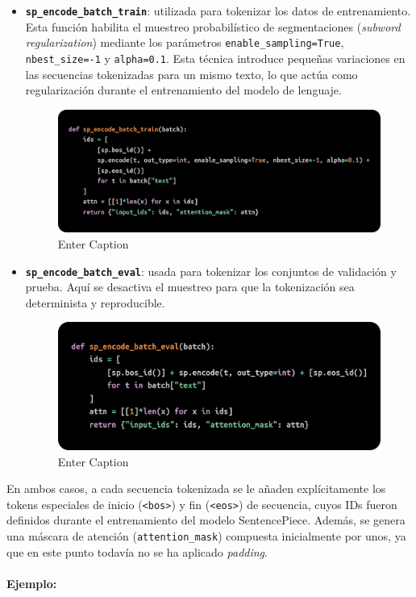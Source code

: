 \documentclass[11pt]{book}
\begin{document}
\begin{itemize}
    \item \textbf{\texttt{sp\_encode\_batch\_train}}: utilizada para tokenizar los datos de entrenamiento. Esta función habilita el muestreo probabilístico de segmentaciones (\textit{subword regularization}) mediante los parámetros \texttt{enable\_sampling=True}, \texttt{nbest\_size=-1} y \texttt{alpha=0.1}. Esta técnica introduce pequeñas variaciones en las secuencias tokenizadas para un mismo texto, lo que actúa como regularización durante el entrenamiento del modelo de lenguaje.
\begin{figure}[h]
    \centering
    \includegraphics[width=0.5\linewidth]{img/train_tok.png}
    \caption{Enter Caption}
    \label{fig:placeholder4}
\end{figure}
    \item \textbf{\texttt{sp\_encode\_batch\_eval}}: usada para tokenizar los conjuntos de validación y prueba. Aquí se desactiva el muestreo para que la tokenización sea determinista y reproducible.

    \begin{figure}[h]
        \centering
        \includegraphics[width=0.5\linewidth]{img/test_tok.png}
        \caption{Enter Caption}
        \label{fig:placeholder5}
    \end{figure}
\end{itemize}

En ambos casos, a cada secuencia tokenizada se le añaden explícitamente los tokens especiales de inicio (\texttt{<bos>}) y fin (\texttt{<eos>}) de secuencia, cuyos IDs fueron definidos durante el entrenamiento del modelo SentencePiece. Además, se genera una máscara de atención (\texttt{attention\_mask}) compuesta inicialmente por unos, ya que en este punto todavía no se ha aplicado \textit{padding}.

\paragraph{Ejemplo:}
\end{document}
